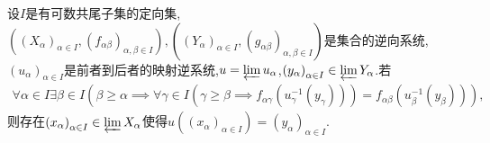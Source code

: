 \begin{corollary}{}{}
	设$I$是有可数共尾子集的定向集,$\left(\left(X_{\alpha}\right)_{\alpha\in I},\left(f_{\alpha\beta}\right)_{\alpha,\beta\in I}\right),\left(\left(Y_{\alpha}\right)_{\alpha\in I},\left(g_{\alpha\beta}\right)_{\alpha,\beta\in I}\right)$是集合的逆向系统,$\left(u_{\alpha}\right)_{\alpha\in I}$是前者到后者的映射逆系统,$u=\varprojlim u_{\alpha}$,$\left(y_{\alpha}\right)_{\alpha\in I}\in\varprojlim Y_{\alpha}$.若
	\begin{align*}
		\forall\alpha\in I\exists\beta\in I\left(\beta\geq\alpha\implies\forall\gamma\in I\left(\gamma\geq\beta\implies f_{\alpha\gamma}\left(u_{\gamma}^{-1}\left(y_{\gamma}\right)\right)\right)=f_{\alpha\beta}\left(u_{\beta}^{-1}\left(y_{\beta}\right)\right)\right),
	\end{align*}
	则存在$\left(x_{\alpha}\right)_{\alpha\in I}\in\varprojlim X_{\alpha}$使得$u\left(\left(x_{\alpha}\right)_{\alpha\in I}\right)=\left(y_{\alpha}\right)_{\alpha\in I}$.
\end{corollary}



















